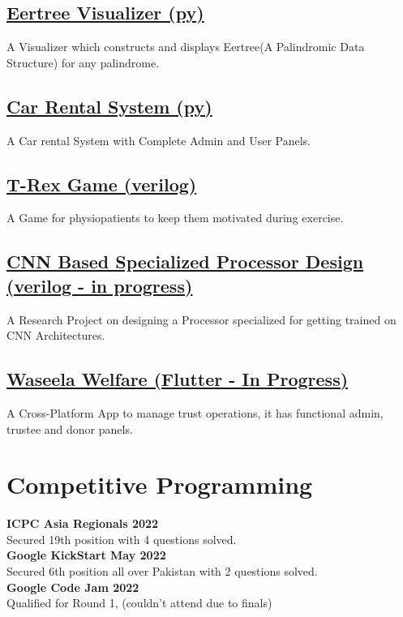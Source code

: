 \documentclass[]{plushcv}
\begin{document}
\begin{minipage}[t]{0.40\textwidth}
    \subsection{\href{https://github.com/smabbasht/CS201-DataSructures-II-Project-eertree}{\textbf{Eertree Visualizer (py)}}}
    A Visualizer which constructs and displays Eertree(A Palindromic Data Structure) for any palindrome.

    \subsection{\href{https://github.com/smabbasht/HU-DSA-Project}{\textbf{Car Rental System (py)}}}
    A Car rental System with Complete Admin and User Panels.

    \subsection{\href{https://github.com/smabbasht/CS370-DIgital-Logic-Design-Project}{\textbf{T-Rex Game (verilog)}}}
    A Game for physiopatients to keep them motivated during exercise.
    
    \subsection{\href{https://github.com/smabbasht/CS330-ResearchProject-ComputerArchitecture}{CNN Based Specialized Processor Design (verilog - in progress)}}
    A Research Project on designing a Processor specialized for getting trained on CNN Architectures.

    \subsection{\href{https://github.com/smabbasht/Waseela-Welfare}{\textbf{Waseela Welfare (Flutter -  In Progress)}}}
    A Cross-Platform App to manage trust operations, it has functional admin, trustee and donor panels.
 


\section{Competitive Programming} 
\textbf{ICPC Asia Regionals 2022}\\
Secured 19th position with 4 questions solved. \\ 
\textbf{Google KickStart May 2022}\\
Secured 6th position all over Pakistan with 2 questions solved.\\ 
\textbf{Google Code Jam 2022}\\
Qualified for Round 1, (couldn't attend due to finals) \\ 


\end{minipage} 
\end{document}
